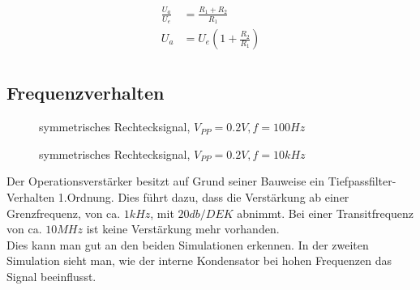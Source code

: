 \begin{align*}
 \frac{U_a}{U_e} &= \frac{R_1 + R_2}{R_1}\\
 U_a &= U_e \left( 1+\frac{R_2}{R_1} \right)\\
\end{align*}

\subsection{Frequenzverhalten}

\begin{figure}[H]
  \centering
  \caption{symmetrisches Rechtecksignal, $V_{PP}=0.2V, f=100Hz$}
\end{figure}

\begin{figure}[H]
  \centering
  \caption{symmetrisches Rechtecksignal, $V_{PP}=0.2V, f=10kHz$}
\end{figure}

Der Operationsverstärker besitzt auf Grund seiner Bauweise ein Tiefpassfilter-Verhalten 1.Ordnung. Dies führt dazu, dass die Verstärkung ab einer Grenzfrequenz,
von ca. $1kHz$, mit $20db/DEK$ abnimmt. Bei einer Transitfrequenz von ca. $10MHz$ ist keine Verstärkung mehr vorhanden.\\
Dies kann man gut an den beiden Simulationen erkennen. In der zweiten Simulation sieht man, wie der interne Kondensator bei hohen Frequenzen das Signal
beeinflusst.\\
